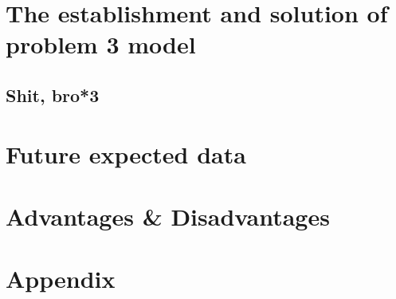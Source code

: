 \documentclass[12pt]{article}
\begin{document}
\section{The establishment and solution of problem 3 model}\label{sec:the-establishment-and-solution-of-problem-3-model} %
	\subsection{Shit, bro*3}\label{subsec:shit-bro*3} %
	
\section{Future expected data}\label{sec:future-expected-data} %

\section{Advantages \& Disadvantages}\label{sec:advantages-&-disadvantages} %



\section*{Appendix}\label{sec:appendix} %
\end{document}
